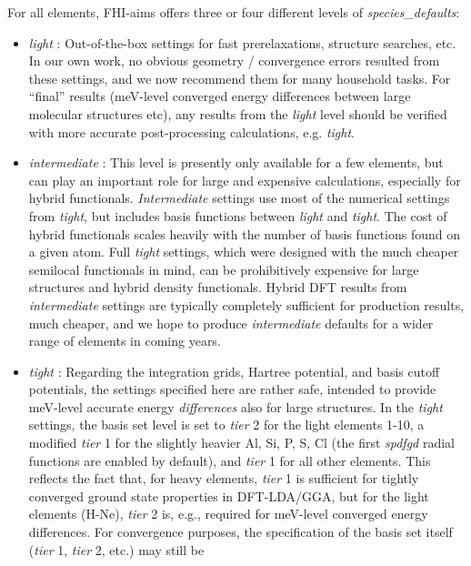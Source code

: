 For all elements, FHI-aims offers three or four different levels of
\emph{species\_defaults}: 
\begin{itemize}
  \item \emph{light} :
    Out-of-the-box settings for fast prerelaxations, structure searches,
    etc. In our own work, no obvious geometry / convergence errors resulted
    from these settings, and we now recommend them for many household
    tasks. For ``final'' results (meV-level converged energy differences between
    large molecular structures etc), any results from the \emph{light} level
    should be verified with more accurate post-processing calculations,
    e.g. \emph{tight}. 
  \item \emph{intermediate} :
    This level is presently only available for a few elements, but can
    play an important role for large and expensive calculations,
    especially for hybrid functionals. \emph{Intermediate} settings
    use most of the  
    numerical settings from \emph{tight}, but includes basis functions
    between \emph{light} and \emph{tight}. The cost of hybrid
    functionals scales heavily with the number of basis functions
    found on a given atom. Full \emph{tight} settings, which were
    designed with the much cheaper semilocal functionals in mind, can
    be prohibitively expensive for large structures and hybrid density
    functionals. Hybrid DFT results from \emph{intermediate} settings
    are typically completely sufficient for production results, much
    cheaper, and we hope to produce \emph{intermediate} defaults for a
    wider range of elements in coming years.
  \item \emph{tight} : 
    Regarding the integration grids, Hartree
    potential, and basis cutoff potentials, the settings specified here are
    rather safe, intended to provide meV-level accurate energy
    \emph{differences} also for large structures. In the \emph{tight} settings,
    the basis set level is set to \emph{tier} 2 for the light elements 1-10, a
    modified \emph{tier} 1 for the slightly heavier Al, Si, P, S, Cl (the first
    \emph{spdfgd} radial functions are enabled by default),
    and \emph{tier} 1 for all other elements. This reflects the fact that, for
    heavy elements, \emph{tier} 1 is sufficient for tightly converged ground
    state properties in DFT-LDA/GGA, but for the light elements (H-Ne),
    \emph{tier} 2 is, e.g., required for meV-level converged energy
    differences. For convergence
    purposes, the specification of the basis set itself (\emph{tier}
    1, \emph{tier} 2, etc.) may still be 

\end{itemize}
